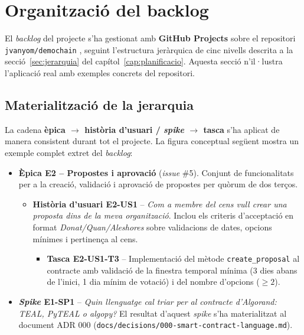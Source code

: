 \section{Organització del backlog}
\label{sec:backlog-desenv}

El \emph{backlog} del projecte s'ha gestionat amb \textbf{GitHub
Projects} sobre el repositori \texttt{jvanyom/demochain}
\cite{demochainrepo}, seguint l'estructura jeràrquica de cinc nivells
descrita a la secció~\ref{sec:jerarquia} del
capítol~\ref{cap:planificacio}. Aquesta secció n'il·lustra l'aplicació
real amb exemples concrets del repositori.

\subsection{Materialització de la jerarquia}
\label{sec:materialitzacio-jerarquia}

La cadena \textbf{èpica $\rightarrow$ història d'usuari / \emph{spike}
$\rightarrow$ tasca} s'ha aplicat de manera consistent durant tot el
projecte. La figura conceptual següent mostra un exemple complet
extret del \emph{backlog}:

\begin{itemize}
    \item \textbf{Èpica E2 -- Propostes i aprovació} (\emph{issue} \#5).
    Conjunt de funcionalitats per a la creació, validació i aprovació
    de propostes per quòrum de dos terços.
    \begin{itemize}
        \item \textbf{Història d'usuari E2-US1} -- \emph{Com a membre
        del cens vull crear una proposta dins de la meva organització}.
        Inclou els criteris d'acceptació en format
        \emph{Donat/Quan/Aleshores} sobre validacions de dates,
        opcions mínimes i pertinença al cens.
        \begin{itemize}
            \item \textbf{Tasca E2-US1-T3} -- Implementació del mètode
            \texttt{create\_proposal} al contracte amb validació de
            la finestra temporal mínima (3 dies abans de l'inici, 1
            dia mínim de votació) i del nombre d'opcions ($\geq 2$).
        \end{itemize}
    \end{itemize}

    \item \textbf{\emph{Spike} E1-SP1} -- \emph{Quin llenguatge cal
    triar per al contracte d'Algorand: TEAL, PyTEAL o algopy?} El
    resultat d'aquest \emph{spike} s'ha materialitzat al document
    \ac{ADR} 000 (\texttt{docs/decisions/000-smart-contract-language.md}).
\end{itemize}

